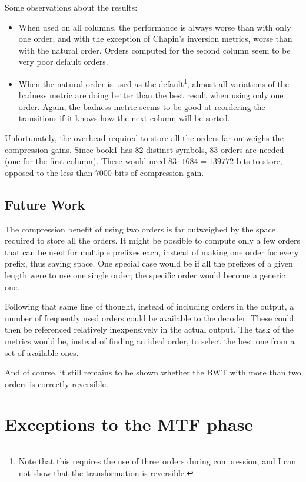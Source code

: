 \documentclass[a4paper]{scrreprt}
\begin{document}
Some observations about the results:

\begin{itemize}
  \item When used on all columns, the performance is always worse than with only
  one order, and with the exception of Chapin's inversion metrics, worse than
  with the natural order. Orders computed for the second column seem to be very
  poor default orders.
  \item When the natural order is used as the default\footnote{Note that this
  requires the use of three orders during compression, and I can not show that
  the transformation is reversible.}, almost all variations of the badness
  metric are doing better than the best result when using only one order. Again,
  the badness metric seems to be good at reordering the transitions if it knows
  how the next column will be sorted.
\end{itemize}

Unfortunately, the overhead required to store all the orders far outweighs the
compression gains. Since book1 has 82 distinct symbols, 83 orders are needed
(one for the first column). These would need \(83 \cdot 1684 = 139772\) bits to
store, opposed to the less than \(7000\) bits of compression gain.

\section{Future Work}

The compression benefit of using two orders is far outweighed by the space
required to store all the orders. It might be possible to compute only a few
orders that can be used for multiple prefixes each, instead of making one order
for every prefix, thus saving space. One special case would be if all the
prefixes of a given length were to use one single order; the specific order
would become a generic one.

Following that same line of thought, instead of including orders in the output,
a number of frequently used orders could be available to the decoder. These
could then be referenced relatively inexpensively in the actual output. The task
of the metrics would be, instead of finding an ideal order, to select the best
one from a set of available ones.

And of course, it still remains to be shown whether the BWT with more than two
orders is correctly reversible.

\chapter{Exceptions to the MTF phase}
\end{document}
